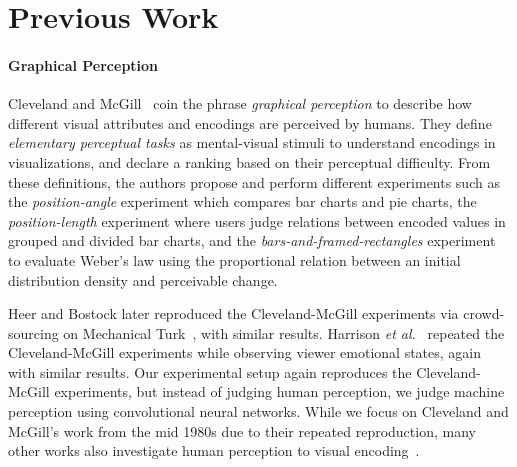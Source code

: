 \section{Previous Work}

\paragraph{Graphical Perception} Cleveland and McGill~\cite{cleveland_mcgill,cleveland1985graphical} coin the phrase \emph{graphical perception} to describe how different visual attributes and encodings are perceived by humans. They define \emph{elementary perceptual tasks} as mental-visual stimuli to understand encodings in visualizations, and declare a ranking based on their perceptual difficulty. From these definitions, the authors propose and perform different experiments such as the \emph{position-angle} experiment which compares bar charts and pie charts, the \emph{position-length} experiment where users judge relations between encoded values in grouped and divided bar charts, and the \emph{bars-and-framed-rectangles} experiment to evaluate Weber's law \cite{harrison2014_webers_law_rank} using the proportional relation between an initial distribution density and perceivable change.

Heer and Bostock later reproduced the Cleveland-McGill experiments via crowd-sourcing on Mechanical Turk~\cite{HeerBostock2010}, with similar results. Harrison \textit{et al.}~\cite{harrison2013influencing} repeated the Cleveland-McGill experiments while observing viewer emotional states, again with similar results. Our experimental setup again reproduces the Cleveland-McGill experiments, but instead of judging human perception, we judge machine perception using convolutional neural networks. While we focus on Cleveland and McGill's work from the mid 1980s due to their repeated reproduction, many other works also investigate human perception to visual encoding~\cite{bertin1967semiologie,treisman1988feature,carpendale2003considering,wilkinson2006grammar,widgor_perception2007,munzner2015visualization}.



